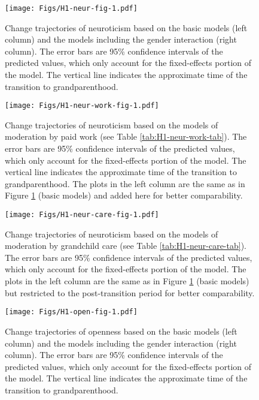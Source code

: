 \documentclass[
  english,
  man,floatsintext]{apa7}
\begin{document}
\begin{figure}
\centering
\texttt{[image: Figs/H1-neur-fig-1.pdf]}
\caption{\label{fig:H1-neur-fig}Change trajectories of neuroticism based on the basic models (left column) and the models including the gender interaction (right column). The error bars are 95\% confidence intervals of the predicted values, which only account for the fixed-effects portion of the model. The vertical line indicates the approximate time of the transition to grandparenthood.}
\end{figure}



\begin{figure}
\centering
\texttt{[image: Figs/H1-neur-work-fig-1.pdf]}
\caption{\label{fig:H1-neur-work-fig}Change trajectories of neuroticism based on the models of moderation by paid work (see Table \ref{tab:H1-neur-work-tab}). The error bars are 95\% confidence intervals of the predicted values, which only account for the fixed-effects portion of the model. The vertical line indicates the approximate time of the transition to grandparenthood. The plots in the left column are the same as in Figure \ref{fig:H1-neur-fig} (basic models) and added here for better comparability.}
\end{figure}



\begin{figure}
\centering
\texttt{[image: Figs/H1-neur-care-fig-1.pdf]}
\caption{\label{fig:H1-neur-care-fig}Change trajectories of neuroticism based on the models of moderation by grandchild care (see Table \ref{tab:H1-neur-care-tab}). The error bars are 95\% confidence intervals of the predicted values, which only account for the fixed-effects portion of the model. The plots in the left column are the same as in Figure \ref{fig:H1-neur-fig} (basic models) but restricted to the post-transition period for better comparability.}
\end{figure}



\begin{figure}
\centering
\texttt{[image: Figs/H1-open-fig-1.pdf]}
\caption{\label{fig:H1-open-fig}Change trajectories of openness based on the basic models (left column) and the models including the gender interaction (right column). The error bars are 95\% confidence intervals of the predicted values, which only account for the fixed-effects portion of the model. The vertical line indicates the approximate time of the transition to grandparenthood.}
\end{figure}
\end{document}
